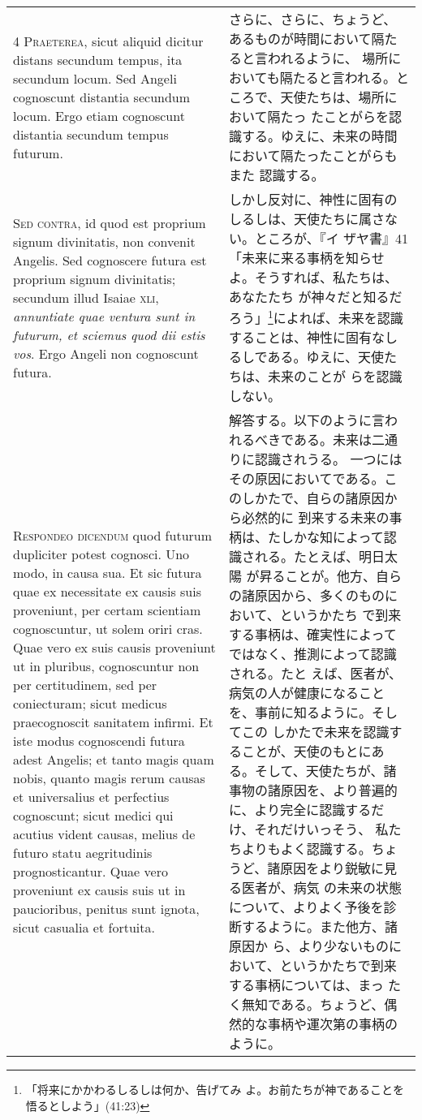 \documentclass[10pt]{jsarticle} %
\begin{document}
\begin{longtable}{p{21em}p{21em}}
\\


{\scshape 4 Praeterea}, sicut aliquid dicitur distans secundum tempus,
ita secundum locum. Sed Angeli cognoscunt distantia secundum
locum. Ergo etiam cognoscunt distantia secundum tempus futurum.


&

さらに、さらに、ちょうど、あるものが時間において隔たると言われるように、
場所においても隔たると言われる。ところで、天使たちは、場所において隔たっ
たことがらを認識する。ゆえに、未来の時間において隔たったことがらもまた
認識する。

\\


{\scshape Sed contra}, id quod est proprium signum divinitatis, non
convenit Angelis. Sed cognoscere futura est proprium signum
divinitatis; secundum illud Isaiae {\scshape xli}, {\itshape
annuntiate quae ventura sunt in futurum, et sciemus quod dii estis
vos}. Ergo Angeli non cognoscunt futura.


&

しかし反対に、神性に固有のしるしは、天使たちに属さない。ところが、『イ
ザヤ書』41「未来に来る事柄を知らせよ。そうすれば、私たちは、あなたたち
が神々だと知るだろう」\footnote{「将来にかかわるしるしは何か、告げてみ
よ。お前たちが神であることを悟るとしよう」(41:23)}によれば、未来を認識
することは、神性に固有なしるしである。ゆえに、天使たちは、未来のことが
らを認識しない。


\\


{\scshape Respondeo dicendum} quod futurum dupliciter potest
cognosci. Uno modo, in causa sua. Et sic futura quae ex necessitate ex
causis suis proveniunt, per certam scientiam cognoscuntur, ut solem
oriri cras. Quae vero ex suis causis proveniunt ut in pluribus,
cognoscuntur non per certitudinem, sed per coniecturam; sicut medicus
praecognoscit sanitatem infirmi. Et iste modus cognoscendi futura
adest Angelis; et tanto magis quam nobis, quanto magis rerum causas et
universalius et perfectius cognoscunt; sicut medici qui acutius vident
causas, melius de futuro statu aegritudinis prognosticantur. Quae vero
proveniunt ex causis suis ut in paucioribus, penitus sunt ignota,
sicut casualia et fortuita.


&

解答する。以下のように言われるべきである。未来は二通りに認識されうる。
一つにはその原因においてである。このしかたで、自らの諸原因から必然的に
到来する未来の事柄は、たしかな知によって認識される。たとえば、明日太陽
が昇ることが。他方、自らの諸原因から、多くのものにおいて、というかたち
で到来する事柄は、確実性によってではなく、推測によって認識される。たと
えば、医者が、病気の人が健康になることを、事前に知るように。そしてこの
しかたで未来を認識することが、天使のもとにある。そして、天使たちが、諸
事物の諸原因を、より普遍的に、より完全に認識するだけ、それだけいっそう、
私たちよりもよく認識する。ちょうど、諸原因をより鋭敏に見る医者が、病気
の未来の状態について、よりよく予後を診断するように。また他方、諸原因か
ら、より少ないものにおいて、というかたちで到来する事柄については、まっ
たく無知である。ちょうど、偶然的な事柄や運次第の事柄のように。


\end{longtable}
\end{document}
